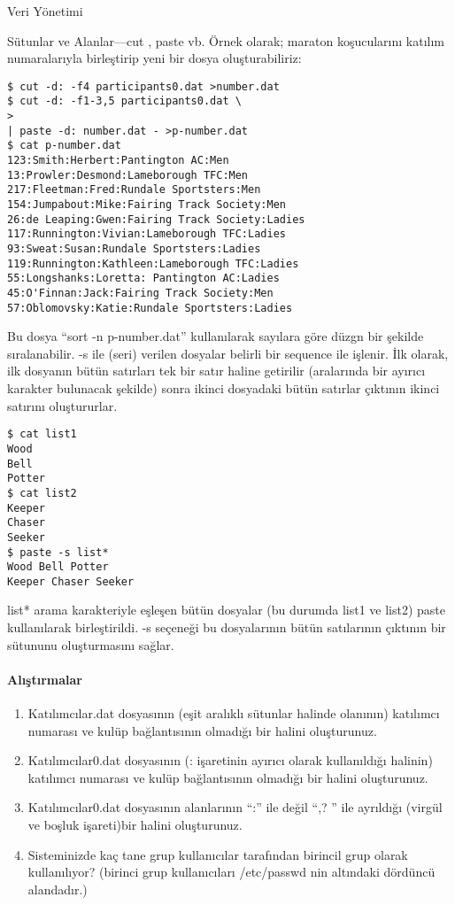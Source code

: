 \begin{section}{Veri Yönetimi}
\begin{subsection}{Sütunlar ve Alanlar—cut , paste vb.}
Örnek olarak; maraton koşucularını katılım numaralarıyla birleştirip yeni bir dosya oluşturabiliriz:
\footnotesize
\begin{verbatim}
$ cut -d: -f4 participants0.dat >number.dat 
$ cut -d: -f1-3,5 participants0.dat \ 
> 
| paste -d: number.dat - >p-number.dat 
$ cat p-number.dat 
123:Smith:Herbert:Pantington AC:Men 
13:Prowler:Desmond:Lameborough TFC:Men 
217:Fleetman:Fred:Rundale Sportsters:Men 
154:Jumpabout:Mike:Fairing Track Society:Men 
26:de Leaping:Gwen:Fairing Track Society:Ladies 
117:Runnington:Vivian:Lameborough TFC:Ladies 
93:Sweat:Susan:Rundale Sportsters:Ladies 
119:Runnington:Kathleen:Lameborough TFC:Ladies 
55:Longshanks:Loretta: Pantington AC:Ladies 
45:O'Finnan:Jack:Fairing Track Society:Men 
57:Oblomovsky:Katie:Rundale Sportsters:Ladies
\end{verbatim}
\normalsize

Bu dosya “sort -n p-number.dat” kullanılarak sayılara göre düzgn bir şekilde sıralanabilir. -s ile (seri) verilen dosyalar belirli bir sequence ile işlenir. İlk olarak, ilk dosyanın bütün satırları tek bir satır haline getirilir (aralarında bir ayırıcı karakter bulunacak şekilde) sonra ikinci dosyadaki bütün satırlar çıktının ikinci satırını oluştururlar.
\footnotesize
\begin{verbatim}
$ cat list1
Wood
Bell
Potter
$ cat list2
Keeper
Chaser
Seeker
$ paste -s list*
Wood Bell Potter
Keeper Chaser Seeker
\end{verbatim}
\normalsize

list* arama karakteriyle eşleşen bütün dosyalar (bu durumda list1 ve list2) paste kullanılarak birleştirildi. -s seçeneği bu dosyalarının bütün satılarının çıktının bir sütununu oluşturmasını sağlar. 

\paragraph{{\Huge{\PencilLeftDown}}Alıştırmalar}{
\begin{enumerate}
 \item Katılımcılar.dat dosyasının (eşit aralıklı sütunlar halinde olanının) katılımcı numarası ve kulüp bağlantısının olmadığı bir halini oluşturunuz.
 \item Katılımcılar0.dat dosyasının (: işaretinin ayırıcı olarak kullanıldığı halinin) katılımcı numarası ve kulüp bağlantısının olmadığı bir halini oluşturunuz.
 \item Katılımcılar0.dat dosyasının alanlarının “:” ile değil “,? ” ile ayrıldığı (virgül ve boşluk işareti)bir halini oluşturunuz.
 \item Sisteminizde kaç tane grup kullanıcılar tarafından birincil grup olarak kullanılıyor? (birinci grup kullanıcıları /etc/passwd nin altındaki dördüncü alandadır.)
\end{enumerate}}


\end{subsection}
\end{section}
